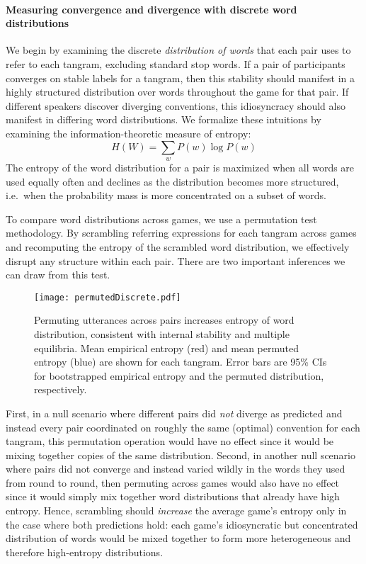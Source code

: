 \paragraph{Measuring convergence and divergence with discrete word distributions}

We begin by examining the discrete \emph{distribution of words} that each pair uses to refer to each tangram, excluding standard stop words.
If a pair of participants converges on stable labels for a tangram, then this stability should manifest in a highly structured distribution over words throughout the game for that pair.
If different speakers discover diverging conventions, this idiosyncracy should also manifest in differing word distributions.
We formalize these intuitions by examining the information-theoretic measure of entropy: $$H(W) = \sum_w P(w) \log P(w)$$
The entropy of the word distribution for a pair is maximized when all words are used equally often and declines as the distribution becomes more structured, i.e.~when the probability mass is more concentrated on a subset of words.

To compare word distributions across games, we use a permutation test methodology.
By scrambling referring expressions for each tangram across games and recomputing the entropy of the scrambled word distribution, we effectively disrupt any structure within each pair.
There are two important inferences we can draw from this test.
\begin{figure}[t!]
\centering
\texttt{[image: permutedDiscrete.pdf]}
\caption{Permuting utterances across pairs increases entropy of word distribution, consistent with internal stability and multiple equilibria. Mean empirical entropy (red) and mean permuted entropy (blue) are shown for each tangram. Error bars are 95\% CIs for bootstrapped empirical entropy and the permuted distribution, respectively.}
\label{fig:permuted}
\end{figure}
First, in a null scenario where different pairs did \emph{not} diverge as predicted and instead every pair coordinated on roughly the same (optimal) convention for each tangram, this permutation operation would have no effect since it would be mixing together copies of the same distribution.
Second, in another null scenario where pairs did not converge and instead varied wildly in the words they used from round to round, then permuting across games would also have no effect since it would simply mix together word distributions that already have high entropy.
Hence, scrambling should \emph{increase} the average game's entropy only in the case where both predictions hold: each game's idiosyncratic but concentrated distribution of words would be mixed together to form more heterogeneous and therefore high-entropy distributions.

